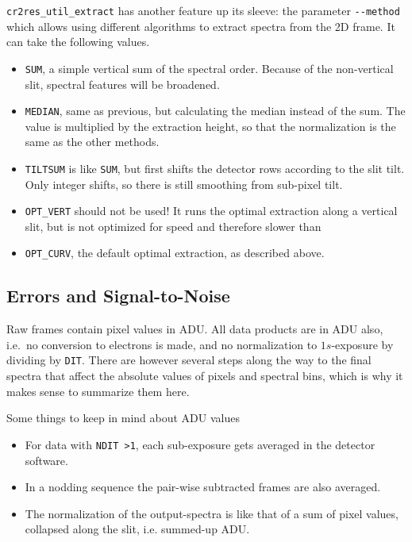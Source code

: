 \verb!cr2res_util_extract! has another feature up its sleeve: the parameter
\verb!--method! which allows using different algorithms to extract spectra from
the 2D frame. It can take the following values.
\begin{itemize}
    \item \verb!SUM!, a simple vertical sum of the spectral order. Because of
    the non-vertical slit, spectral features will be broadened.
    \item \verb!MEDIAN!, same as previous, but calculating the median instead of
    the sum. The value is multiplied by the extraction height, so that the
    normalization is the same as the other methods.
    \item \verb!TILTSUM! is like \verb!SUM!, but first shifts the detector rows
    according to the slit tilt. Only integer shifts, so there is still smoothing
    from sub-pixel tilt.
    \item \verb!OPT_VERT! should not be used! It runs the optimal extraction
    along a vertical slit, but is not optimized for speed and therefore slower
    than
    \item \verb!OPT_CURV!, the default optimal extraction, as described above.
\end{itemize}

\subsection{Errors and Signal-to-Noise}
\label{sec:errors}

Raw frames contain pixel values in ADU. All data products are in ADU also,
i.e.~no conversion to electrons is made, and no normalization to $1s$-exposure by
dividing by \verb!DIT!. There are however several steps along the way to the
final spectra that affect the absolute values of pixels and spectral bins, which
is why it makes sense to summarize them here.

Some things to keep in mind about ADU values
\begin{itemize}
    \item For data with \verb!NDIT >1!, each sub-exposure gets averaged in the
    detector software.
    \item In a nodding sequence the pair-wise subtracted frames are also
    averaged.
    \item The normalization of the output-spectra is like that of a sum of pixel
    values, collapsed along the slit, i.e. summed-up ADU.
\end{itemize}


